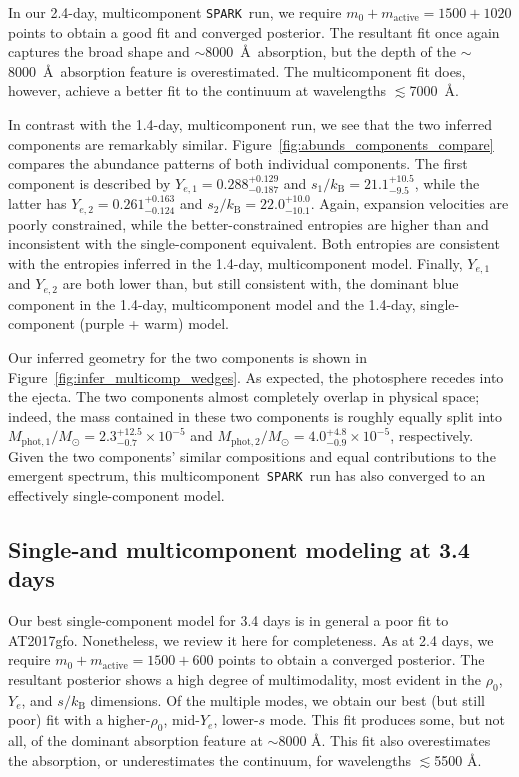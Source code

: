 \documentclass[twocolumn,twocolappendix]{aastex63}
\def\SPARK{\texttt{SPARK}}
\begin{document}
{{{{{{In our 2.4-day, multicomponent \SPARK~run, we require $m_0 + m_{\mathrm{active}} = 1500 + 1020$ points to obtain a good fit and converged posterior. The resultant fit once again captures the broad shape and $\sim$8000~\AA~absorption, but the depth of the $\sim$8000~\AA~absorption feature is overestimated. The multicomponent fit does, however, achieve a better fit to the continuum at wavelengths $\lesssim$7000~\AA. 

In contrast with the 1.4-day, multicomponent run, we see that the two inferred components are remarkably similar. Figure~\ref{fig:abunds_components_compare} compares the abundance patterns of both individual components. The first component is described by $Y_{e,1} = 0.288^{+0.129}_{-0.187}$ and $s_1 / k_{\mathrm{B}} = 21.1^{+10.5}_{-9.5}$, while the latter has $Y_{e,2} = 0.261^{+0.163}_{-0.124}$ and $s_2 / k_{\mathrm{B}} = 22.0^{+10.0}_{-10.1}$. Again, expansion velocities are poorly constrained, while the better-constrained entropies are higher than and inconsistent with the single-component equivalent. Both entropies are consistent with the entropies inferred in the 1.4-day, multicomponent model. Finally, $Y_{e,1}$ and $Y_{e,2}$ are both lower than, but still consistent with, the dominant blue component in the 1.4-day, multicomponent model and the 1.4-day, single-component (purple + warm) model.

Our inferred geometry for the two components is shown in Figure~\ref{fig:infer_multicomp_wedges}. As expected, the photosphere recedes into the ejecta. The two components almost completely overlap in physical space; indeed, the mass contained in these two components is roughly equally split into $M_{\mathrm{phot},1}/M_{\odot} = 2.3^{+12.5}_{-0.7} \times 10^{-5}$ and $M_{\mathrm{phot},2}/M_{\odot} = 4.0^{+4.8}_{-0.9} \times 10^{-5}$, respectively. Given the two components' similar compositions and equal contributions to the emergent spectrum, this multicomponent~\SPARK~run has also converged to an effectively single-component model.




\subsection{Single-and multicomponent modeling at 3.4 days}\label{ssc:3.4}

Our best single-component model for 3.4 days is in general a poor fit to AT2017gfo. Nonetheless, we review it here for completeness. As at 2.4 days, we require $m_0 + m_{\mathrm{active}} = 1500 + 600$ points to obtain a converged posterior. The resultant posterior shows a high degree of multimodality, most evident in the $\rho_0$, $Y_e$, and $s / k_{\mathrm{B}}$ dimensions. Of the multiple modes, we obtain our best (but still poor) fit with a higher-$\rho_0$, mid-$Y_e$, lower-$s$ mode. This fit produces some, but not all, of the dominant absorption feature at $\sim$8000 \AA. This fit also overestimates the absorption, or underestimates the continuum, for wavelengths $\lesssim$5500 \AA. 

}}}}}}
\end{document}

